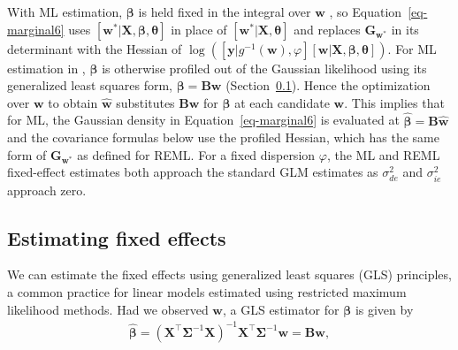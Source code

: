 \documentclass[
]{jss}
\begin{document}
With ML estimation, \(\boldsymbol{\beta}\) is held fixed in the integral
over \(\mathbf{w}\) \citep{bonat2016practical}, so
Equation~\ref{eq-marginal6} uses
\([\mathbf{w}^{*} | \mathbf{X}, \boldsymbol{\beta}, \boldsymbol{\theta}]\)
in place of \([\mathbf{w}^{*} | \mathbf{X}, \boldsymbol{\theta}]\) and
replaces \(\mathbf{G}_{\mathbf{w}^{*}}\) in its determinant with the
Hessian of
\(\log([\mathbf{y} | g^{-1}(\mathbf{w}), \varphi] [\mathbf{w} | \mathbf{X}, \boldsymbol{\beta}, \boldsymbol{\theta}])\).
For ML estimation in , \(\boldsymbol{\beta}\) is otherwise
profiled out of the Gaussian likelihood using its generalized least
squares form, \(\boldsymbol{\beta} = \mathbf{B}\mathbf{w}\)
(Section~\ref{sec:fixed}). Hence the optimization over \(\mathbf{w}\) to
obtain \(\hat{\mathbf{w}}\) substitutes \(\mathbf{B}\mathbf{w}\) for
\(\boldsymbol{\beta}\) at each candidate \(\mathbf{w}\). This implies
that for ML, the Gaussian density in Equation~\ref{eq-marginal6} is
evaluated at \(\hat{\boldsymbol{\beta}} = \mathbf{B}\hat{\mathbf{w}}\)
and the covariance formulas below use the profiled Hessian, which has
the same form of \(\mathbf{G}_{\mathbf{w}^{*}}\) as defined for REML.
For a fixed dispersion \(\varphi\), the ML and REML fixed-effect
estimates both approach the standard GLM estimates as \(\sigma^2_{de}\)
and \(\sigma^2_{ie}\) approach zero.

\subsection{Estimating fixed effects}\label{sec:fixed}

We can estimate the fixed effects using generalized least squares (GLS)
principles, a common practice for linear models estimated using
restricted maximum likelihood methods. Had we observed \(\mathbf{w}\), a
GLS estimator for \(\boldsymbol{\beta}\) is given by
\begin{align}\label{eq-gls1}
  \hat{\boldsymbol{\beta}} = (\mathbf{X}^\top \boldsymbol{\Sigma}^{-1}\mathbf{X})^{-1}\mathbf{X}^\top \boldsymbol{\Sigma}^{-1}\mathbf{w} = \mathbf{B}\mathbf{w},
\end{align}
\end{document}

